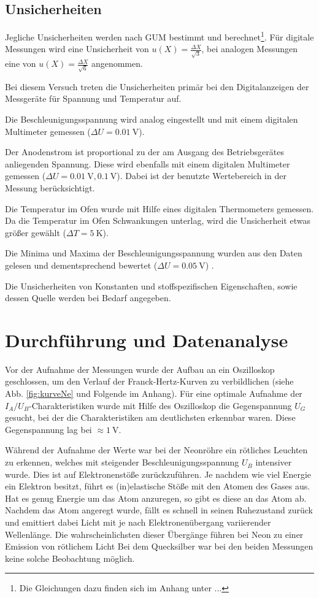 	\subsection{Unsicherheiten}
	
		Jegliche Unsicherheiten werden nach GUM bestimmt und berechnet\footnote{Die Gleichungen dazu finden sich im Anhang unter ... }. %
		Für digitale Messungen wird eine Unsicherheit von $u(X) = \frac{\Delta X}{\sqrt{3}}$, bei analogen Messungen eine von $u(X) = \frac{\Delta X}{\sqrt{6}}$ angenommen.
	
		Bei diesem Versuch treten die Unsicherheiten primär bei den Digitalanzeigen der Messgeräte für Spannung und Temperatur auf.
		
		Die Beschleunigungsspannung wird analog eingestellt und mit einem digitalen Multimeter gemessen ($\Delta U = \SI{0.01}{\volt}$).
	
		Der Anodenstrom ist proportional zu der am Ausgang des Betriebsgerätes anliegenden Spannung.
		Diese wird ebenfalls mit einem digitalen Multimeter gemessen ($\Delta U = \SI{0.01}{\volt}, \SI{0.1}{\volt}$).
		Dabei ist der benutzte Wertebereich in der Messung berücksichtigt.
		
		Die Temperatur im Ofen wurde mit Hilfe eines digitalen Thermometers gemessen.
		Da die Temperatur im Ofen Schwankungen unterlag, wird die Unsicherheit etwas größer gewählt ($\Delta T = \SI{5}{\kelvin}$).
		
		Die Minima und Maxima der Beschleunigungsspannung wurden aus den Daten gelesen und dementsprechend bewertet ($\Delta U = \SI{0.05}{\volt}$) .
		
		Die Unsicherheiten von Konstanten und stoffspezifischen Eigenschaften, sowie dessen Quelle werden bei Bedarf angegeben.

\section{Durchführung und Datenanalyse}
	
	Vor der Aufnahme der Messungen wurde der Aufbau an ein Oszilloskop geschlossen, um den Verlauf der Franck-Hertz-Kurven zu verbildlichen (siehe Abb. \ref{fig:kurveNe} und Folgende im Anhang).
	Für eine optimale Aufnahme der $I_A/U_B$-Charakteristiken wurde mit Hilfe des Oszilloskop die Gegenspannung $U_G$ gesucht, bei der die Charakteristiken am deutlichsten erkennbar waren.
	Diese Gegenspannung lag bei $\approx \SI{1}{\volt}$.
	
	Während der Aufnahme der Werte war bei der Neonröhre ein rötliches Leuchten zu erkennen, welches mit steigender Beschleunigungsspannung $U_B$ intensiver wurde. 
	Dies ist auf Elektronenstöße zurückzuführen.
	Je nachdem wie viel Energie ein Elektron besitzt, führt es (in)elastische Stöße mit den Atomen des Gases aus. 
	Hat es genug Energie um das Atom anzuregen, so gibt es diese an das Atom ab.
	Nachdem das Atom angeregt wurde, fällt es schnell in seinen Ruhezustand zurück und emittiert dabei Licht mit je nach Elektronenübergang variierender Wellenlänge.
	Die wahrscheinlichsten dieser Übergänge führen bei Neon zu einer Emission von rötlichem Licht 
	Bei dem Quecksilber war bei den beiden Messungen keine solche Beobachtung möglich.
	
